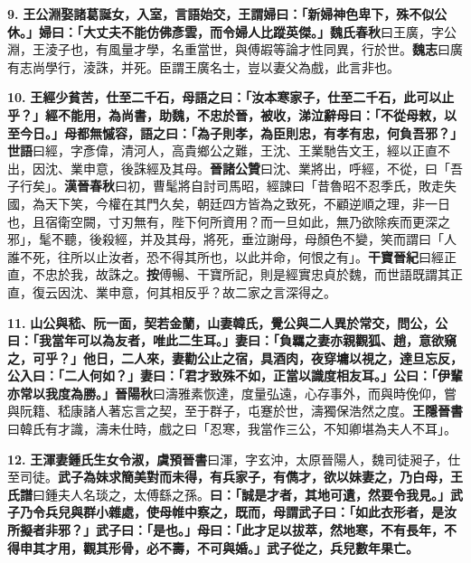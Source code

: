 \textbf{9.} \textbf{王公淵娶諸葛誕女，入室，言語始交，王謂婦曰：「新婦神色卑下，殊不似公休。」婦曰：「大丈夫不能仿佛彥雲，而令婦人比蹤英傑。」}{\footnotesize \textbf{魏氏春秋}曰王廣，字公淵，王淩子也，有風量才學，名重當世，與傅嘏等論才性同異，行於世。\textbf{魏志}曰廣有志尚學行，淩誅，并死。臣謂王廣名士，豈以妻父為戲，此言非也。}

\textbf{10.} \textbf{王經少貧苦，仕至二千石，母語之曰：「汝本寒家子，仕至二千石，此可以止乎？」經不能用，為尚書，助魏，不忠於晉，被收，涕泣辭母曰：「不從母敕，以至今日。」母都無慽容，語之曰：「為子則孝，為臣則忠，有孝有忠，何負吾邪？」}{\footnotesize \textbf{世語}曰經，字彥偉，清河人，高貴鄉公之難，王沈、王業馳告文王，經以正直不出，因沈、業申意，後誅經及其母。\textbf{晉諸公贊}曰沈、業將出，呼經，不從，曰「吾子行矣」。\textbf{漢晉春秋}曰初，曹髦將自討司馬昭，經諫曰「昔魯昭不忍季氏，敗走失國，為天下笑，今權在其門久矣，朝廷四方皆為之致死，不顧逆順之理，非一日也，且宿衛空闕，寸刃無有，陛下何所資用？而一旦如此，無乃欲除疾而更深之邪」，髦不聽，後殺經，并及其母，將死，垂泣謝母，母顏色不變，笑而謂曰「人誰不死，往所以止汝者，恐不得其所也，以此并命，何恨之有」。\textbf{干寶晉紀}曰經正直，不忠於我，故誅之。\textbf{按}傅暢、干寶所記，則是經實忠貞於魏，而世語既謂其正直，復云因沈、業申意，何其相反乎？故二家之言深得之。}

\textbf{11.} \textbf{山公與嵇、阮一面，契若金蘭，山妻韓氏，覺公與二人異於常交，問公，公曰：「我當年可以為友者，唯此二生耳。」妻曰：「負羈之妻亦親觀狐、趙，意欲窺之，可乎？」他日，二人來，妻勸公止之宿，具酒肉，夜穿墉以視之，達旦忘反，公入曰：「二人何如？」妻曰：「君才致殊不如，正當以識度相友耳。」公曰：「伊輩亦常以我度為勝。」}{\footnotesize \textbf{晉陽秋}曰濤雅素恢達，度量弘遠，心存事外，而與時俛仰，嘗與阮籍、嵇康諸人著忘言之契，至于群子，屯蹇於世，濤獨保浩然之度。\textbf{王隱晉書}曰韓氏有才識，濤未仕時，戲之曰「忍寒，我當作三公，不知卿堪為夫人不耳」。}

\textbf{12.} \textbf{王渾妻鍾氏生女令淑，}{\footnotesize \textbf{虞預晉書}曰渾，字玄沖，太原晉陽人，魏司徒昶子，仕至司徒。}\textbf{武子為妹求簡美對而未得，有兵家子，有儁才，欲以妹妻之，乃白母，}{\footnotesize \textbf{王氏譜}曰鍾夫人名琰之，太傅繇之孫。}\textbf{曰：「誠是才者，其地可遺，然要令我見。」武子乃令兵兒與群小雜處，使母帷中察之，既而，母謂武子曰：「如此衣形者，是汝所擬者非邪？」武子曰：「是也。」母曰：「此才足以拔萃，然地寒，不有長年，不得申其才用，觀其形骨，必不壽，不可與婚。」武子從之，兵兒數年果亡。}

